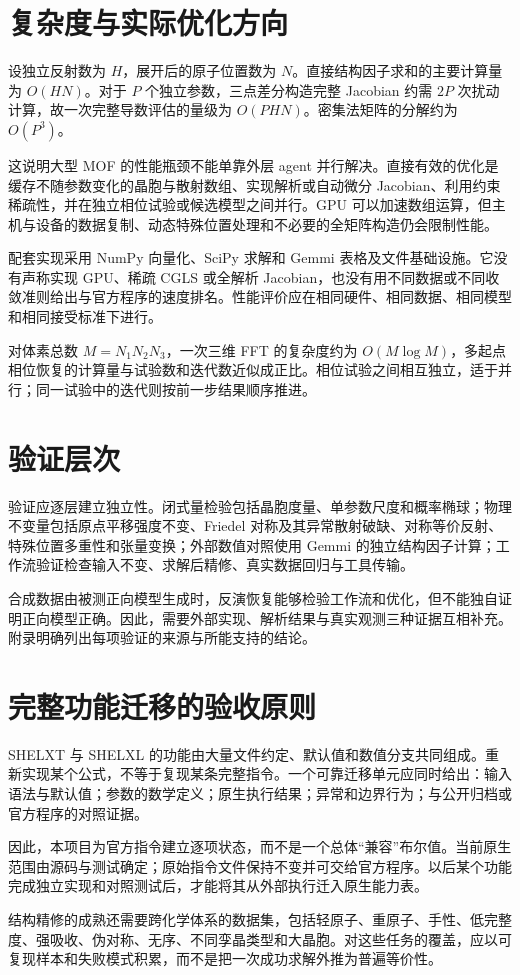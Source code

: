 \section{复杂度与实际优化方向}
设独立反射数为 $H$，展开后的原子位置数为 $N$。直接结构因子求和的主要计算量为 $O(HN)$。对于 $P$ 个独立参数，三点差分构造完整 Jacobian 约需 $2P$ 次扰动计算，故一次完整导数评估的量级为 $O(PHN)$。密集法矩阵的分解约为 $O(P^3)$。

这说明大型 MOF 的性能瓶颈不能单靠外层 agent 并行解决。直接有效的优化是缓存不随参数变化的晶胞与散射数组、实现解析或自动微分 Jacobian、利用约束稀疏性，并在独立相位试验或候选模型之间并行。GPU 可以加速数组运算，但主机与设备的数据复制、动态特殊位置处理和不必要的全矩阵构造仍会限制性能。

配套实现采用 NumPy 向量化、SciPy 求解和 Gemmi 表格及文件基础设施。它没有声称实现 GPU、稀疏 CGLS 或全解析 Jacobian，也没有用不同数据或不同收敛准则给出与官方程序的速度排名。性能评价应在相同硬件、相同数据、相同模型和相同接受标准下进行。

对体素总数 $M=N_1N_2N_3$，一次三维 FFT 的复杂度约为 $O(M\log M)$，多起点相位恢复的计算量与试验数和迭代数近似成正比。相位试验之间相互独立，适于并行；同一试验中的迭代则按前一步结果顺序推进。

\section{验证层次}
验证应逐层建立独立性。闭式量检验包括晶胞度量、单参数尺度和概率椭球；物理不变量包括原点平移强度不变、Friedel 对称及其异常散射破缺、对称等价反射、特殊位置多重性和张量变换；外部数值对照使用 Gemmi 的独立结构因子计算；工作流验证检查输入不变、求解后精修、真实数据回归与工具传输。

合成数据由被测正向模型生成时，反演恢复能够检验工作流和优化，但不能独自证明正向模型正确。因此，需要外部实现、解析结果与真实观测三种证据互相补充。附录明确列出每项验证的来源与所能支持的结论。

\section{完整功能迁移的验收原则}
SHELXT 与 SHELXL 的功能由大量文件约定、默认值和数值分支共同组成。重新实现某个公式，不等于复现某条完整指令。一个可靠迁移单元应同时给出：输入语法与默认值；参数的数学定义；原生执行结果；异常和边界行为；与公开归档或官方程序的对照证据。

因此，本项目为官方指令建立逐项状态，而不是一个总体“兼容”布尔值。当前原生范围由源码与测试确定；原始指令文件保持不变并可交给官方程序。以后某个功能完成独立实现和对照测试后，才能将其从外部执行迁入原生能力表。

结构精修的成熟还需要跨化学体系的数据集，包括轻原子、重原子、手性、低完整度、强吸收、伪对称、无序、不同孪晶类型和大晶胞。对这些任务的覆盖，应以可复现样本和失败模式积累，而不是把一次成功求解外推为普遍等价性。
